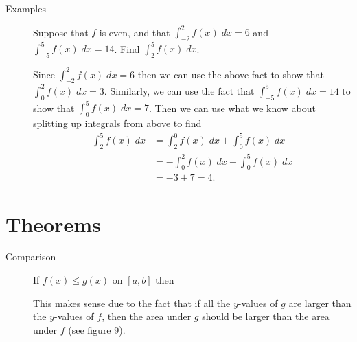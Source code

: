 \documentclass[11pt]{article}
\begin{document}
\begin{description}
\item[Examples] Suppose that $f$ is even, and that $\int_{-2}^2
  f(x)\;dx=6$ and $\int_{-5}^5 f(x)\;dx=14$.  Find $\int_2^5
  f(x)\;dx$.

  Since $\int_{-2}^2 f(x)\;dx=6$ then we can use the above fact to
  show that $\int_{0}^2 f(x)\;dx=3$.  Similarly, we can use the fact
  that $\int_{-5}^5 f(x)\;dx=14$ to show that $\int_{0}^5 f(x)\;dx=7$.
  Then we can use what we know about splitting up integrals from above
  to find
  \begin{align*}
    \int_{2}^5 f(x)\;dx &= \int_{2}^0 f(x)\;dx + \int_{0}^5 f(x)\;dx\\
    &= -\int_{0}^2 f(x)\;dx + \int_{0}^5 f(x)\;dx\\
    &= -3 + 7 = 4.
  \end{align*}

  
\end{description}

\section*{Theorems}
\begin{description}
\item[Comparison] If $f(x)\leq g(x)$ on $[a,b]$ then
  \begin{center}
  \end{center}
  This makes sense due to the fact that if all the $y$-values of $g$
  are larger than the $y$-values of $f$, then the area under $g$
  should be larger than the area under $f$ (see figure 9).
\end{description}
\end{document}
